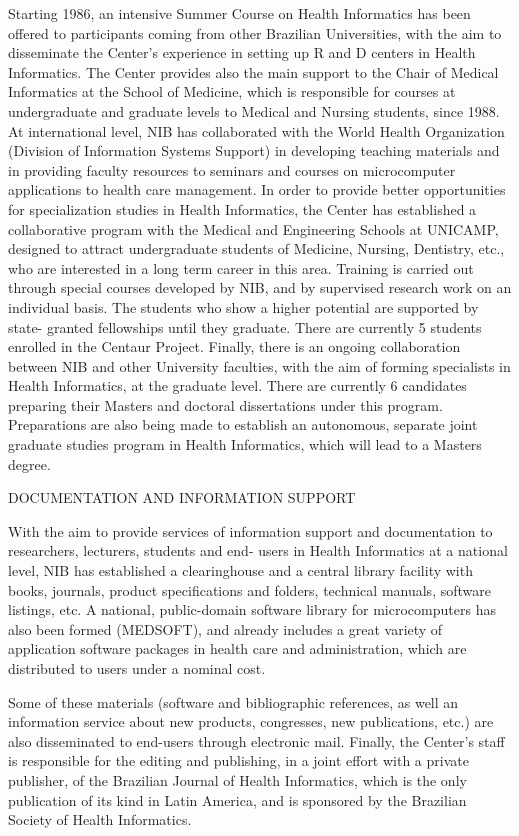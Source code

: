 Starting 1986, an intensive Summer Course on Health
Informatics has been offered to participants coming from
other Brazilian Universities, with the aim to disseminate
the Center's experience in setting up R and D centers in Health
Informatics.
The Center provides also the main support to the Chair of
Medical Informatics at the School of Medicine, which is
responsible for courses at undergraduate and graduate levels
to Medical and Nursing students, since 1988.
At international level, NIB has collaborated with the
World Health Organization (Division of Information Systems
Support) in developing teaching materials and in providing
faculty resources to seminars and courses on microcomputer
applications to health care management.
In order to provide better opportunities for specialization
studies in Health Informatics, the Center has established a
collaborative program with the Medical and Engineering
Schools at UNICAMP, designed to attract undergraduate
students of Medicine, Nursing, Dentistry, etc., who are
interested in a long term career in this area. Training is
carried out through special courses developed by NIB, and by
supervised research work on an individual basis. The
students who show a higher potential are supported by state-
granted fellowships until they graduate. There are currently
5 students enrolled in the Centaur Project.
Finally, there is an ongoing collaboration between NIB and
other University faculties, with the aim of forming
specialists in Health Informatics, at the graduate level.
There are currently 6 candidates preparing their Masters and
doctoral dissertations under this program. Preparations are
also being made to establish an autonomous, separate joint
graduate studies program in Health Informatics, which will
lead to a Masters degree.
 
DOCUMENTATION AND INFORMATION SUPPORT
 
With the aim to provide services of information support and
documentation to researchers, lecturers, students and end-
users in Health Informatics at a national level, NIB has
established  a clearinghouse and a central library facility
with books, journals, product  specifications and folders,
technical  manuals, software listings, etc. A national,
public-domain software library for microcomputers has also
been formed (MEDSOFT), and already includes a great variety
of application software packages in health care and
administration, which are distributed to users under a
nominal cost.
 
Some of these materials (software and bibliographic
references, as well an information service about new
products, congresses, new publications, etc.) are also
disseminated to end-users through electronic mail.
Finally, the Center's staff is responsible for the editing
and publishing, in a joint effort with a private publisher,
of the Brazilian Journal of Health Informatics, which is the
only publication of its kind in Latin America, and is
sponsored by the Brazilian Society of Health Informatics.
 

